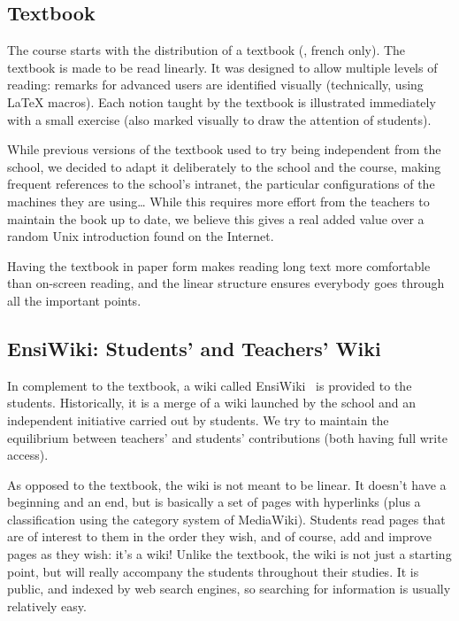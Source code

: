 \documentclass{sig-alternate}
\newcommand{\citeensiwiki}[0]{\cite{ensiwiki-blind}}
\newcommand{\citetextbook}[0]{\cite{poly-intro-unix-blind}}
\newcommand{\citeensiwiki}[0]{\cite{ensiwiki}}
\newcommand{\citetextbook}[0]{\cite{poly-intro-unix}}
\begin{document}
\subsection{Textbook}

The course starts with the distribution of a textbook
(\citetextbook, french only). The textbook is
made to be read linearly. It was designed to allow multiple levels of
reading: remarks for advanced users are identified visually
(technically, using \LaTeX{} macros). Each notion taught by the
textbook is illustrated immediately with a small exercise (also marked
visually to draw the attention of students).

While previous versions of the textbook used to try being independent
from the school, we decided to adapt it deliberately to the school and
the course, making frequent references to the school's intranet, the
particular configurations of the machines they are using\dots{} While
this requires more effort from the teachers to maintain the book up to
date, we believe this gives a real added value over a random Unix
introduction found on the Internet.

Having the textbook in
paper form makes reading long text more comfortable than on-screen
reading, and the linear structure ensures everybody goes through all
the important points.

\subsection{EnsiWiki: Students' and Teachers' Wiki}

In complement to the textbook, a wiki called EnsiWiki~\citeensiwiki
is provided to the students. Historically, it is a merge of a
wiki launched by the school and an independent initiative carried out by
students. We try to maintain the equilibrium between teachers'
and students' contributions (both having full write
access).

As opposed to the textbook, the wiki is not meant to be linear. It
doesn't have a beginning and an end, but is basically a set of pages
with hyperlinks (plus a classification using the category system of
MediaWiki).
Students read pages that are of interest
to them in the order they wish, and of course, add and improve pages
as they wish: it's a wiki! Unlike the textbook, the wiki is not just a
starting point, but will really accompany the students throughout
their studies. It is public, and indexed
by web search engines, so searching for information is usually
relatively easy.
\end{document}
